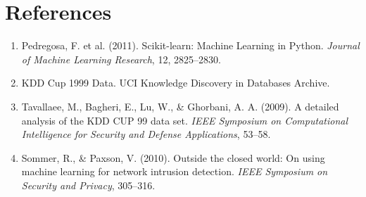 \documentclass[12pt,a4paper]{article}
\begin{document}
\section*{References}
\begin{enumerate}
  \item Pedregosa, F. et al. (2011). Scikit-learn: Machine Learning in Python.
        \textit{Journal of Machine Learning Research}, 12, 2825--2830.
  \item KDD Cup 1999 Data. UCI Knowledge Discovery in Databases Archive.
  \item Tavallaee, M., Bagheri, E., Lu, W., \& Ghorbani, A. A. (2009). A detailed analysis of the KDD CUP 99 data set. \textit{IEEE Symposium on Computational Intelligence for Security and Defense Applications}, 53--58.
  \item Sommer, R., \& Paxson, V. (2010). Outside the closed world: On using machine learning for network intrusion detection. \textit{IEEE Symposium on Security and Privacy}, 305--316.
\end{enumerate}
\end{document}
